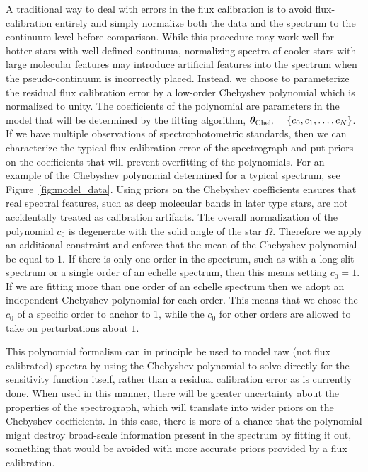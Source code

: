 \documentclass[preprint]{aastex} %
\newcommand{\vt}{ {\bm \theta}}
\newcommand{\vtcheb}{\vt_{\rm Cheb}}
\begin{document}
A traditional way to deal with errors in the flux calibration is to avoid flux-calibration entirely and simply normalize both the data and the spectrum to the continuum level before comparison.  While this procedure may work well for hotter stars with well-defined continuua, normalizing spectra of cooler stars with large molecular features may introduce artificial features into the spectrum when the pseudo-continuum is incorrectly placed.  Instead, we choose to parameterize the residual flux calibration error by a low-order Chebyshev polynomial which is normalized to unity. The coefficients of the polynomial are parameters in the model that will be determined by the fitting algorithm, $\vtcheb = \{c_0, c_1, \ldots, c_N \}$. If we have multiple observations of spectrophotometric standards, then we can characterize the typical flux-calibration error of the spectrograph and put priors on the coefficients that will prevent overfitting of the polynomials.  For an example of the Chebyshev polynomial determined for a typical spectrum, see Figure~\ref{fig:model_data}. Using priors on the Chebyshev coefficients ensures that real spectral features, such as deep molecular bands in later type stars, are not accidentally treated as calibration artifacts. The overall normalization of the polynomial $c_0$ is degenerate with the solid angle of the star $\Omega$. Therefore we apply an additional constraint and enforce that the mean of the Chebyshev polynomial be equal to $1$. If there is only one order in the spectrum, such as with a long-slit spectrum or a single order of an echelle spectrum, then this means setting $c_0 = 1$. If we are fitting more than one order of an echelle spectrum then we adopt an independent Chebyshev polynomial for each order. This means that we chose the $c_0$ of a specific order to anchor to 1, while the $c_0$ for other orders are allowed to take on perturbations about $1$. 

This polynomial formalism can in principle be used to model raw (not flux calibrated) spectra by using the Chebyshev polynomial to solve directly for the sensitivity function itself, rather than a residual calibration error as is currently done. When used in this manner, there will be greater uncertainty about the properties of the spectrograph, which will translate into wider priors on the Chebyshev coefficients.  In this case, there is more of a chance that the polynomial might destroy broad-scale information present in the spectrum by fitting it out, something that would be avoided with more accurate priors provided by a flux calibration.
\end{document}
